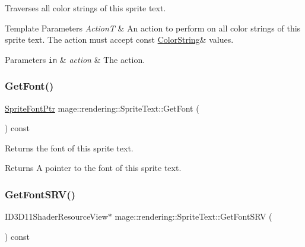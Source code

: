 Traverses all color strings of this sprite text.


\begin{DoxyTemplParams}{Template Parameters}
{\em ActionT} & An action to perform on all color strings of this sprite text. The action must accept {\ttfamily const} {\ttfamily \mbox{\hyperlink{classmage_1_1rendering_1_1_color_string}{Color\+String}}\&} values. \\
\hline
\end{DoxyTemplParams}

\begin{DoxyParams}[1]{Parameters}
\mbox{\tt in}  & {\em action} & The action. \\
\hline
\end{DoxyParams}
\mbox{\label{classmage_1_1rendering_1_1_sprite_text_a4ec33c106762e7f8d4d04cde0bf03669}} 
\subsubsection{\texorpdfstring{Get\+Font()}{GetFont()}}
{\footnotesize\ttfamily \mbox{\hyperlink{namespacemage_1_1rendering_ab2f34196c20422ca3692ad3f3bff3a5d}{Sprite\+Font\+Ptr}} mage\+::rendering\+::\+Sprite\+Text\+::\+Get\+Font (\begin{DoxyParamCaption}{ }\end{DoxyParamCaption}) const\hspace{0.3cm}{\ttfamily [noexcept]}}

Returns the font of this sprite text.

\begin{DoxyReturn}{Returns}
A pointer to the font of this sprite text. 
\end{DoxyReturn}
\mbox{\label{classmage_1_1rendering_1_1_sprite_text_af9e6eb6e62d9c638dc86a7a978524aa9}} 
\subsubsection{\texorpdfstring{Get\+Font\+S\+R\+V()}{GetFontSRV()}}
{\footnotesize\ttfamily I\+D3\+D11\+Shader\+Resource\+View$\ast$ mage\+::rendering\+::\+Sprite\+Text\+::\+Get\+Font\+S\+RV (\begin{DoxyParamCaption}{ }\end{DoxyParamCaption}) const\hspace{0.3cm}{\ttfamily [noexcept]}}

